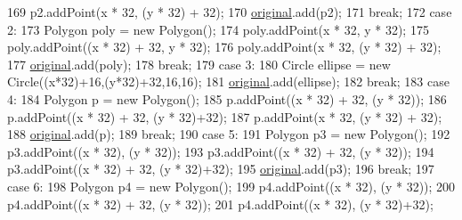 \begin{DoxyCode}
{169                         p2.addPoint(x * 32, (y * 32) + 32);
170                         \mbox{\hyperlink{classorg_1_1newdawn_1_1slick_1_1tests_1_1_geom_util_tile_test_a8aaaaee0d0ab2ac3b0a21ccb95983bda}{original}}.add(p2);
171                         \textcolor{keywordflow}{break};
172                     \textcolor{keywordflow}{case} 2:
173                         Polygon poly = \textcolor{keyword}{new} Polygon();
174                         poly.addPoint(x * 32, y * 32);
175                         poly.addPoint((x * 32) + 32, y * 32);
176                         poly.addPoint(x * 32, (y * 32) + 32);
177                         \mbox{\hyperlink{classorg_1_1newdawn_1_1slick_1_1tests_1_1_geom_util_tile_test_a8aaaaee0d0ab2ac3b0a21ccb95983bda}{original}}.add(poly);
178                         \textcolor{keywordflow}{break};
179                     \textcolor{keywordflow}{case} 3:
180                         Circle ellipse = \textcolor{keyword}{new} Circle((x*32)+16,(y*32)+32,16,16);
181                         \mbox{\hyperlink{classorg_1_1newdawn_1_1slick_1_1tests_1_1_geom_util_tile_test_a8aaaaee0d0ab2ac3b0a21ccb95983bda}{original}}.add(ellipse);
182                         \textcolor{keywordflow}{break};
183                     \textcolor{keywordflow}{case} 4:
184                         Polygon p = \textcolor{keyword}{new} Polygon();
185                         p.addPoint((x * 32) + 32, (y * 32));
186                         p.addPoint((x * 32) + 32, (y * 32)+32);
187                         p.addPoint(x * 32, (y * 32) + 32);
188                         \mbox{\hyperlink{classorg_1_1newdawn_1_1slick_1_1tests_1_1_geom_util_tile_test_a8aaaaee0d0ab2ac3b0a21ccb95983bda}{original}}.add(p);
189                         \textcolor{keywordflow}{break};
190                     \textcolor{keywordflow}{case} 5:
191                         Polygon p3 = \textcolor{keyword}{new} Polygon();
192                         p3.addPoint((x * 32), (y * 32));
193                         p3.addPoint((x * 32) + 32, (y * 32));
194                         p3.addPoint((x * 32) + 32, (y * 32)+32);
195                         \mbox{\hyperlink{classorg_1_1newdawn_1_1slick_1_1tests_1_1_geom_util_tile_test_a8aaaaee0d0ab2ac3b0a21ccb95983bda}{original}}.add(p3);
196                         \textcolor{keywordflow}{break};
197                     \textcolor{keywordflow}{case} 6:
198                         Polygon p4 = \textcolor{keyword}{new} Polygon();
199                         p4.addPoint((x * 32), (y * 32));
200                         p4.addPoint((x * 32) + 32, (y * 32));
201                         p4.addPoint((x * 32), (y * 32)+32);
}
\end{DoxyCode}
